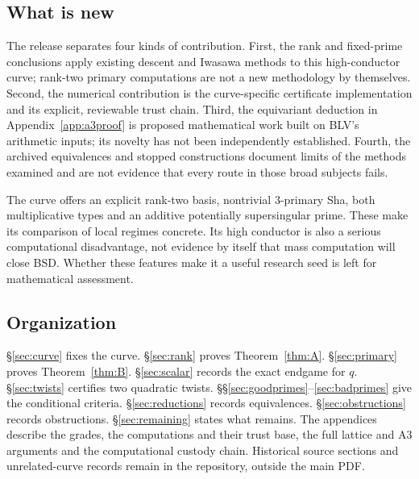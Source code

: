 \subsection{What is new}
The release separates four kinds of contribution. First, the rank and fixed-prime conclusions apply existing descent and Iwasawa methods to this high-conductor curve; rank-two primary computations are not a new methodology by themselves. Second, the numerical contribution is the curve-specific certificate implementation and its explicit, reviewable trust chain. Third, the equivariant deduction in Appendix~\ref{app:a3proof} is proposed mathematical work built on BLV's arithmetic inputs; its novelty has not been independently established. Fourth, the archived equivalences and stopped constructions document limits of the methods examined and are not evidence that every route in those broad subjects fails.

The curve offers an explicit rank-two basis, nontrivial $3$-primary Sha, both multiplicative types and an additive potentially supersingular prime. These make its comparison of local regimes concrete. Its high conductor is also a serious computational disadvantage, not evidence by itself that mass computation will close BSD. Whether these features make it a useful research seed is left for mathematical assessment.

\subsection{Organization}
\S\ref{sec:curve} fixes the curve. \S\ref{sec:rank} proves Theorem~\ref{thm:A}. \S\ref{sec:primary} proves Theorem~\ref{thm:B}. \S\ref{sec:scalar} records the exact endgame for $q$. \S\ref{sec:twists} certifies two quadratic twists. \S\S\ref{sec:goodprimes}--\ref{sec:badprimes} give the conditional criteria. \S\ref{sec:reductions} records equivalences. \S\ref{sec:obstructions} records obstructions. \S\ref{sec:remaining} states what remains. The appendices describe the grades, the computations and their trust base, the full lattice and A3 arguments and the computational custody chain. Historical source sections and unrelated-curve records remain in the repository, outside the main PDF.
